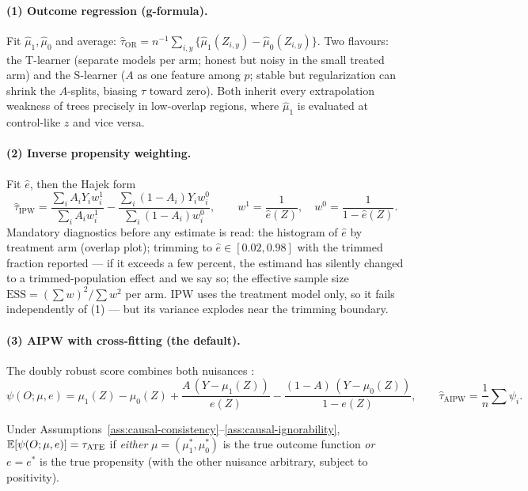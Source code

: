 \paragraph{(1) Outcome regression (g-formula).}
Fit $\hat\mu_1, \hat\mu_0$ and average:
$\hat\tau_{\mathrm{OR}} = n^{-1} \sum_{i,y} \{\hat\mu_1(Z_{i,y}) -
\hat\mu_0(Z_{i,y})\}$. Two flavours: the T-learner (separate models per arm; honest but
noisy in the small treated arm) and the S-learner ($A$ as one feature among $p$; stable
but regularization can shrink the $A$-splits, biasing $\hat\tau$ toward zero). Both
inherit every extrapolation weakness of trees precisely in low-overlap regions, where
$\hat\mu_{1}$ is evaluated at control-like $z$ and vice versa.

\paragraph{(2) Inverse propensity weighting.}
Fit $\hat e$, then the Hajek form
\[
\hat\tau_{\mathrm{IPW}}
= \frac{\sum_i A_i Y_i w_i^1}{\sum_i A_i w_i^1}
- \frac{\sum_i (1-A_i) Y_i w_i^0}{\sum_i (1-A_i) w_i^0},
\qquad
w^1 = \frac{1}{\hat e(Z)}, \quad w^0 = \frac{1}{1 - \hat e(Z)}.
\]
Mandatory diagnostics before any estimate is read:
the histogram of $\hat e$ by treatment arm (overlap plot); trimming to
$\hat e \in [0.02, 0.98]$ with the trimmed fraction reported --- if it exceeds a few
percent, the estimand has silently changed to a trimmed-population effect and we say
so; the effective sample size $\mathrm{ESS} = (\sum w)^2 / \sum w^2$ per arm. IPW uses
the treatment model only, so it fails independently of (1) --- but its variance explodes
near the trimming boundary.

\paragraph{(3) AIPW with cross-fitting (the default).}
The doubly robust score combines both nuisances \cite{chernozhukov2018}:
\begin{equation}
\psi(O; \mu, e) = \mu_1(Z) - \mu_0(Z)
+ \frac{A\,(Y - \mu_1(Z))}{e(Z)}
- \frac{(1-A)\,(Y - \mu_0(Z))}{1 - e(Z)},
\qquad
\hat\tau_{\mathrm{AIPW}} = \frac{1}{n} \sum \psi_i .
\label{eq:causal-aipw}
\end{equation}

\begin{proposition}
\label{prop:causal-dr}
Under Assumptions~\ref{ass:causal-consistency}--\ref{ass:causal-ignorability},
$\mathbb{E}[\psi(O; \mu, e)] = \tau_{\mathrm{ATE}}$ if \emph{either} $\mu = (\mu_1^*, \mu_0^*)$
is the true outcome function \emph{or} $e = e^*$ is the true propensity (with the other
nuisance arbitrary, subject to positivity).
\end{proposition}

